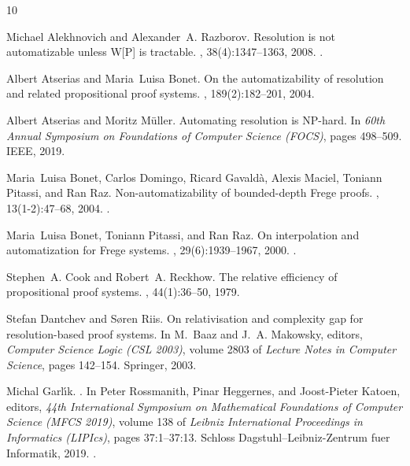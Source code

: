 \begin{thebibliography}{10}

Michael Alekhnovich and Alexander~A. Razborov.
\newblock Resolution is not automatizable unless {W[P]} is tractable.
, 38(4):1347--1363, 2008.
\newblock \href {http://dx.doi.org/10.1137/06066850X}
  {}.

Albert Atserias and Maria~Luisa Bonet.
\newblock On the automatizability of resolution and related propositional proof
  systems.
, 189(2):182--201, 2004.

Albert Atserias and Moritz M{\"u}ller.
\newblock Automating resolution is {NP}-hard.
\newblock In {\em 60th Annual Symposium on Foundations of Computer Science
  (FOCS)}, pages 498--509. IEEE, 2019.

Maria~Luisa Bonet, Carlos Domingo, Ricard Gavald\`a, Alexis Maciel, Toniann
  Pitassi, and Ran Raz.
\newblock Non-automatizability of bounded-depth {F}rege proofs.
, 13(1-2):47--68, 2004.
\newblock \href {http://dx.doi.org/10.1007/s00037-004-0183-5}
  {}.

Maria~Luisa Bonet, Toniann Pitassi, and Ran Raz.
\newblock On interpolation and automatization for {F}rege systems.
, 29(6):1939--1967, 2000.
\newblock \href {http://dx.doi.org/10.1137/S0097539798353230}
  {}.

Stephen~A. Cook and Robert~A. Reckhow.
\newblock The relative efficiency of propositional proof systems.
, 44(1):36--50, 1979.

Stefan Dantchev and S{\o}ren Riis.
\newblock On relativisation and complexity gap for resolution-based proof
  systems.
\newblock In M.~Baaz and J.~A. Makowsky, editors, {\em Computer Science Logic
  (CSL 2003)}, volume 2803 of {\em Lecture Notes in Computer Science}, pages
  142--154. Springer, 2003.

Michal Garl{\'\i}k.
.
\newblock In Peter Rossmanith, Pinar Heggernes, and Joost-Pieter Katoen,
  editors, {\em 44th International Symposium on Mathematical Foundations of
  Computer Science (MFCS 2019)}, volume 138 of {\em Leibniz International
  Proceedings in Informatics (LIPIcs)}, pages 37:1--37:13. Schloss
  Dagstuhl--Leibniz-Zentrum fuer Informatik, 2019.
\newblock \href {http://dx.doi.org/10.4230/LIPIcs.MFCS.2019.37}
  {}.


\end{thebibliography}
